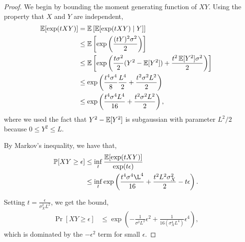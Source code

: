 \documentclass[tablecaption=bottom]{jmlr}
\begin{document}
\begin{proof}
  We begin by bounding the moment generating function of $XY$. Using the property that $X$ and $Y$ are independent,
  \begin{align*}
    \operatorname{\mathbb{E}}[ \exp(t X Y) ] 
      &= \operatorname{\mathbb{E}}\left[ \operatorname{\mathbb{E}}[ \exp(t X Y) \mid Y ] \right] \\
      &\le \operatorname{\mathbb{E}}\left[ \exp\left(\frac{(tY)^2 \sigma^2}{2}\right) \right] \\
      &\le \operatorname{\mathbb{E}}\left[ \exp\left(\frac{t \sigma^2}{2} (Y^2 - \operatorname{\mathbb{E}}[Y^2]) + \frac{t^2 \operatorname{\mathbb{E}}[Y^2] \sigma^2}{2}\right) \right] \\
      &\le \exp\left(\frac{t^4 \sigma^4}{8} \frac{L^4}{2}  + \frac{t^2\sigma^2 L^2}{2}\right) \\
      &\le \exp\left(\frac{t^4 \sigma^4 L^4}{16}  + \frac{t^2 \sigma^2 L^2}{2}\right),
  \end{align*}
  where we used the fact that $Y^2 - \operatorname{\mathbb{E}}[Y^2]$ is subgaussian with parameter $L^2/2$ because $0 \le Y^2 \le L$.

  By Markov's inequality, we have that,
  \begin{align*}
    \Pr[ XY \ge \epsilon ] 
      &\le \inf_t \frac{\E[\exp(t XY)]}{\exp(t\epsilon)} \\
      &\le \inf_t \exp\left(\frac{t^4 \sigma^4 \L^4 }{16} + \frac{t^2 L^2 \sigma^2_X}{2} - t\epsilon\right).
  \end{align*}

  Setting $t = \frac{\epsilon}{\sigma^2_X L^2 }$, we get the bound,
  \begin{align*}
    \Pr[ XY \ge \epsilon ] 
      &\le 
        \exp\left( - \frac{1}{\sigma^2 L^2} \epsilon^{2} 
          + \frac{1}{16 (\sigma^4_X L^4)} \epsilon^{4} \right),
  \end{align*}
  which is dominated by the $-\epsilon^2$ term for small $\epsilon$.
\end{proof}
\end{document}
